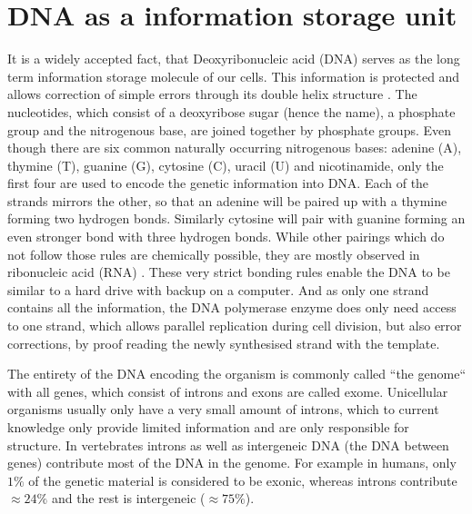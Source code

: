 \section[DNA]{DNA as a information storage unit}
\label{intro-sec:DNA}
It is a widely accepted fact, that Deoxyribonucleic acid (DNA) serves as the long term information storage molecule of our cells. This information is protected and allows correction of simple errors through its double helix structure \cite{Watson1953,Liang1998}. The nucleotides, which consist of a deoxyribose sugar (hence the name), a phosphate group and the nitrogenous base, are joined together by phosphate groups. Even though there are six common naturally occurring nitrogenous bases: adenine (A), thymine (T), guanine (G), cytosine (C), uracil (U) and nicotinamide, only the first four are used to encode the genetic information into DNA. Each of the strands mirrors the other, so that an adenine will be paired up with a thymine forming two hydrogen bonds. Similarly cytosine will pair with guanine forming an even stronger bond with three hydrogen bonds. While other pairings which do not follow those rules are chemically possible, they are mostly observed in ribonucleic acid (RNA) \cite{Sinden1994}. These very strict bonding rules enable the DNA to be similar to a hard drive with backup on a computer. And as only one strand contains all the information, the DNA polymerase enzyme does only need access to one strand, which allows parallel replication during cell division, but also error corrections, by proof reading the newly synthesised strand with the template.

The entirety of the DNA encoding the organism is commonly called ``the genome`` with all genes, which consist of introns and exons are called exome. Unicellular organisms usually only have a very small amount of introns, which to current knowledge only provide limited information and are only responsible for structure. In vertebrates  introns as well as intergeneic DNA (the DNA between genes) contribute most of the DNA in the genome. For example in humans, only $1\%$ of the genetic material is considered to be exonic, whereas introns contribute $\approx 24\%$ and the rest is intergeneic ($\approx 75\%$)\cite{Venter2001}.

